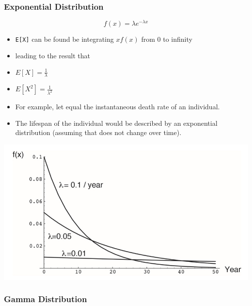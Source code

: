\documentclass[]{book}
\providecommand{\tightlist}{%
  \setlength{\itemsep}{0pt}\setlength{\parskip}{0pt}}
\begin{document}
\hypertarget{exponential-distribution}{%
\subsubsection{\texorpdfstring{\textbf{Exponential Distribution}}{Exponential Distribution}}\label{exponential-distribution}}

\[f(x)=\lambda e^{-\lambda x}\]

\begin{itemize}
\tightlist
\item
  \texttt{E{[}X{]}} can be found be integrating \(xf(x)\) from 0 to infinity
\end{itemize}

\begin{itemize}
\tightlist
\item
  leading to the result that
\end{itemize}

\begin{itemize}
\item
  \(E[X] = \frac{1}{\lambda}\)
\item
  \(E[X^2] = \frac{1}{\lambda^2}\)
\item
  For example, let equal the instantaneous death rate of an individual.
\item
  The lifespan of the individual would be described by an exponential distribution (assuming that does not change over time).
\end{itemize}

\begin{center}\includegraphics[width=0.7\linewidth]{images/prob.020} \end{center}

\hypertarget{gamma-distribution}{%
\subsubsection{\texorpdfstring{\textbf{Gamma Distribution}}{Gamma Distribution}}\label{gamma-distribution}}
\end{document}
